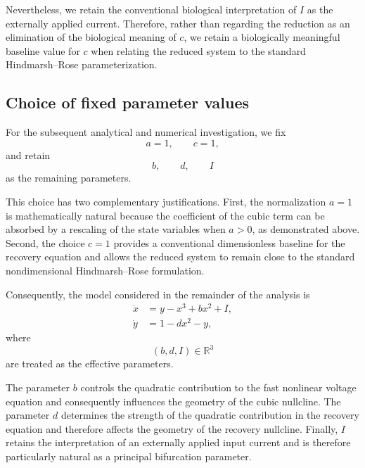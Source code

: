 \documentclass[11pt,a4paper]{article}
\begin{document}
Nevertheless, we retain the conventional biological interpretation
of $I$ as the externally applied current. Therefore, rather than
regarding the reduction as an elimination of the biological meaning
of $c$, we retain a biologically meaningful baseline value for $c$
when relating the reduced system to the standard Hindmarsh--Rose
parameterization.

\subsection{Choice of fixed parameter values}

For the subsequent analytical and numerical investigation, we fix
\begin{equation}
\boxed{
a=1,\qquad c=1,
}
\tag{8}
\end{equation}
and retain
\begin{equation}
\boxed{
b,\qquad d,\qquad I
}
\end{equation}
as the remaining parameters.

This choice has two complementary justifications. First, the
normalization $a=1$ is mathematically natural because the coefficient
of the cubic term can be absorbed by a rescaling of the state
variables when $a>0$, as demonstrated above. Second, the choice
$c=1$ provides a conventional dimensionless baseline for the
recovery equation and allows the reduced system to remain close to
the standard nondimensional Hindmarsh--Rose formulation.

Consequently, the model considered in the remainder of the analysis
is
\begin{equation}
\boxed{
\begin{aligned}
\dot{x}&=y-x^3+b x^2+I,\\
\dot{y}&=1-dx^2-y,
\end{aligned}}
\tag{9}
\end{equation}
where
\begin{equation}
\boxed{
(b,d,I)\in\mathbb{R}^3
}
\end{equation}
are treated as the effective parameters.

The parameter $b$ controls the quadratic contribution to the fast
nonlinear voltage equation and consequently influences the geometry
of the cubic nullcline. The parameter $d$ determines the strength of
the quadratic contribution in the recovery equation and therefore
affects the geometry of the recovery nullcline. Finally, $I$ retains
the interpretation of an externally applied input current and is
therefore particularly natural as a principal bifurcation parameter.
\end{document}
